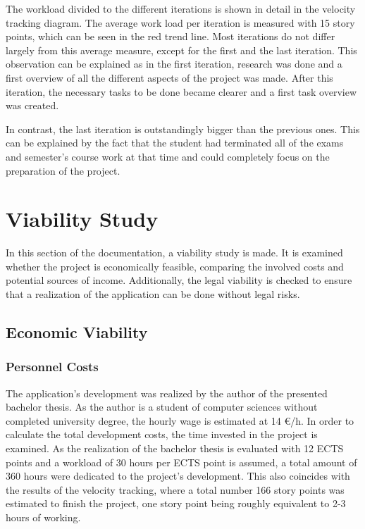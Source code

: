 
The workload divided to the different iterations is shown in detail in the velocity tracking diagram. The average work load per iteration is measured with 15 story points, which can be seen in the red trend line. Most iterations do not differ largely from this average measure, except for the first and the last iteration. This observation can be explained as in the first iteration, research was done and a first overview of all the different aspects of the project was made. After this iteration, the necessary tasks to be done became clearer and a first task overview was created.

In contrast, the last iteration is outstandingly bigger than the previous ones. This can be explained by the fact that the student had terminated all of the exams and semester’s course work at that time and could completely focus on the preparation of the project.


\section{Viability Study}
In this section of the documentation, a viability study is made. It is examined whether the project is economically feasible, comparing the involved costs and potential sources of income. Additionally, the legal viability is checked to ensure that a realization of the application can be done without legal risks. 

\subsection{Economic Viability}
\subsubsection{Personnel Costs}
The application’s development was realized by the author of the presented bachelor thesis. As the author is a student of computer sciences without completed university degree, the hourly wage is estimated at 14 €/h. In order to calculate the total development costs, the time invested in the project is examined. As the realization of the bachelor thesis is evaluated with 12 ECTS points and a workload of 30 hours per ECTS point is assumed, a total amount of 360 hours were dedicated to the project’s development. This also coincides with the results of the velocity tracking, where a total number 166 story points was estimated to finish the project, one story point being roughly equivalent to 2-3 hours of working.

